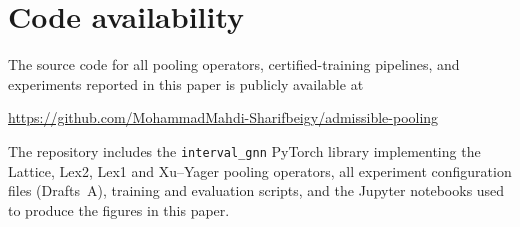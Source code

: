 \documentclass[preprint,12pt]{elsarticle}
\theoremstyle{definition}
\begin{document}
\section*{Code availability}
The source code for all pooling operators, certified-training pipelines, and experiments reported in this paper is publicly available at
\begin{center}
  \url{https://github.com/MohammadMahdi-Sharifbeigy/admissible-pooling}
\end{center}
The repository includes the \texttt{interval\_gnn} PyTorch library implementing the Lattice, Lex2, Lex1 and Xu--Yager pooling operators, all experiment configuration files (Drafts~A), training and evaluation scripts, and the Jupyter notebooks used to produce the figures in this paper.



\end{document}
